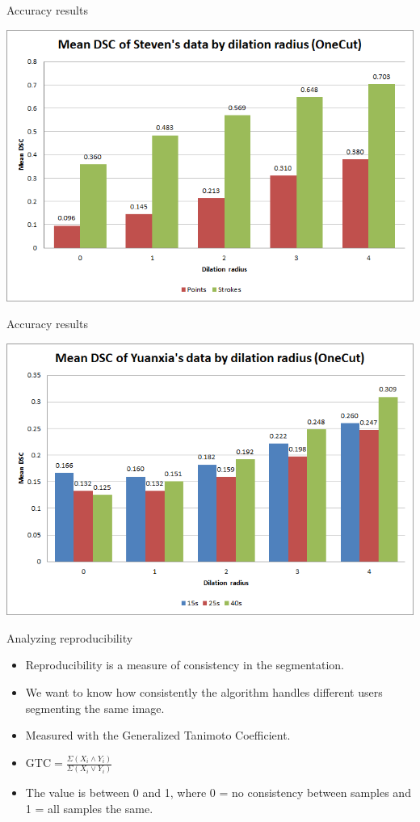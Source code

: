 \documentclass[14pt,xcolor=dvipsnames]{beamer}
\begin{document}
\begin{frame}[fragile,t]{Accuracy results}
	\begin{center}
		\includegraphics[width=\paperheight]{steven_onecut_dsc}
	\end{center}
\end{frame}

\begin{frame}[fragile,t]{Accuracy results}
	\begin{center}
		\includegraphics[width=\paperheight]{yuanxia_onecut_dsc}
	\end{center}
\end{frame}

\begin{frame}[fragile,t]{Analyzing reproducibility}
	\begin{itemize}
		\item Reproducibility is a measure of consistency in the segmentation.
		\item We want to know how consistently the algorithm handles different users segmenting the same image.
		\item Measured with the Generalized Tanimoto Coefficient.
		\item $\text{GTC} = \frac{\Sigma \left( X_i \wedge Y_i \right)}{\Sigma \left( X_i \vee Y_i \right)}$
		\item The value is between 0 and 1, where 0 = no consistency between samples and 1 = all samples the same.
	\end{itemize}
\end{frame}
\end{document}
